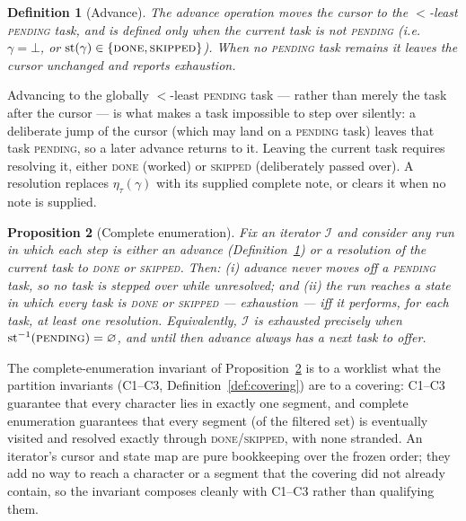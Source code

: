 \documentclass[11pt,a4paper]{article}
\newtheorem{definition}{Definition}[section]
\newtheorem{proposition}[definition]{Proposition}
\begin{document}
\begin{definition}[Advance]\label{def:advance}
The \emph{advance} operation moves the cursor to the $<$-least
\textsc{pending} task, and is defined only when the current task is not
\textsc{pending} (i.e.\ $\gamma = \bot$, or $\mathrm{st}(\gamma) \in
\{\textsc{done}, \textsc{skipped}\}$). When no \textsc{pending} task
remains it leaves the cursor unchanged and reports exhaustion.
\end{definition}

Advancing to the globally $<$-least \textsc{pending} task --- rather than
merely the task after the cursor --- is what makes a task impossible to
step over silently: a deliberate jump of the cursor (which may land on a
\textsc{pending} task) leaves that task \textsc{pending}, so a later
advance returns to it. Leaving the current task requires resolving it,
either \textsc{done} (worked) or \textsc{skipped} (deliberately passed
over). A resolution replaces $\eta_\tau(\gamma)$ with its supplied complete
note, or clears it when no note is supplied.

\begin{proposition}[Complete enumeration]\label{prop:enumeration}
Fix an iterator $\mathcal{I}$ and consider any run in which each step is
either an \emph{advance} (Definition~\ref{def:advance}) or a resolution of
the current task to \textsc{done} or \textsc{skipped}. Then: (i) advance
never moves off a \textsc{pending} task, so no task is stepped over while
unresolved; and (ii) the run reaches a state in which every task is
\textsc{done} or \textsc{skipped} --- \emph{exhaustion} --- iff it performs,
for each task, at least one resolution. Equivalently, $\mathcal{I}$ is
exhausted precisely when $\mathrm{st}^{-1}(\textsc{pending}) = \varnothing$,
and until then advance always has a next task to offer.
\end{proposition}

The complete-enumeration invariant of Proposition~\ref{prop:enumeration} is
to a worklist what the partition invariants (C1--C3,
Definition~\ref{def:covering}) are to a covering: C1--C3 guarantee that
every character lies in exactly one segment, and complete enumeration
guarantees that every segment (of the filtered set) is eventually visited
and resolved exactly through \textsc{done}/\textsc{skipped}, with none
stranded. An iterator's cursor and state map are pure bookkeeping over the
frozen order; they add no way to reach a character or a segment that the
covering did not already contain, so the invariant composes cleanly with
C1--C3 rather than qualifying them.
\end{document}
